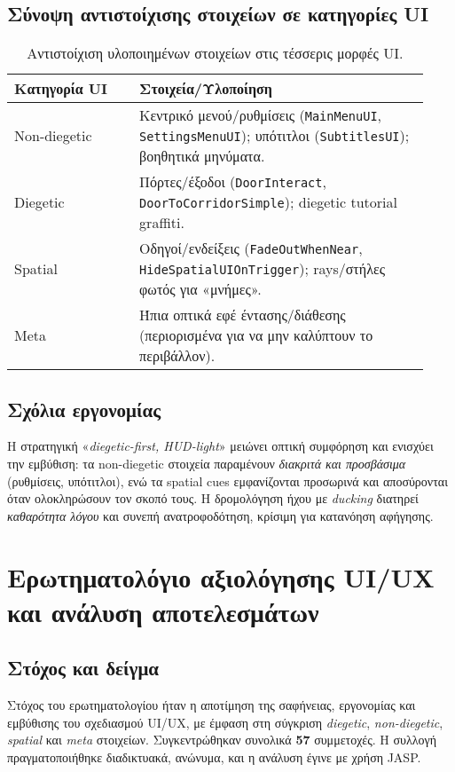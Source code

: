 \subsection{Σύνοψη αντιστοίχισης στοιχείων σε κατηγορίες UI}
\begin{table}[h]
\centering
\begin{tabular}{p{0.28\linewidth} p{0.65\linewidth}}
\toprule
\textbf{Κατηγορία UI} & \textbf{Στοιχεία/Υλοποίηση} \\
\midrule
Non-diegetic & Κεντρικό μενού/ρυθμίσεις (\texttt{MainMenuUI}, \texttt{SettingsMenuUI}); υπότιτλοι (\texttt{SubtitlesUI}); βοηθητικά μηνύματα.  \\
Diegetic & Πόρτες/έξοδοι (\texttt{DoorInteract}, \texttt{DoorToCorridorSimple}); diegetic tutorial graffiti.  \\
Spatial & Οδηγοί/ενδείξεις (\texttt{FadeOutWhenNear}, \texttt{HideSpatialUIOnTrigger}); rays/στήλες φωτός για «μνήμες».  \\
Meta & Ήπια οπτικά εφέ έντασης/διάθεσης (περιορισμένα για να μην καλύπτουν το περιβάλλον). \\
\bottomrule
\end{tabular}
\caption{Αντιστοίχιση υλοποιημένων στοιχείων στις τέσσερις μορφές UI.}
\end{table}


\subsection{Σχόλια εργονομίας}
Η στρατηγική «\textit{diegetic-first, HUD-light}» μειώνει οπτική συμφόρηση και ενισχύει την εμβύθιση: τα non-diegetic στοιχεία παραμένουν \emph{διακριτά και προσβάσιμα} (ρυθμίσεις, υπότιτλοι), ενώ τα spatial cues εμφανίζονται προσωρινά και αποσύρονται όταν ολοκληρώσουν τον σκοπό τους. Η δρομολόγηση ήχου με \textit{ducking} διατηρεί \emph{καθαρότητα λόγου} και συνεπή ανατροφοδότηση, κρίσιμη για κατανόηση αφήγησης.

\section{Ερωτηματολόγιο αξιολόγησης UI/UX και ανάλυση αποτελεσμάτων}
\subsection{Στόχος και δείγμα}
Στόχος του ερωτηματολογίου ήταν η αποτίμηση της σαφήνειας, εργονομίας και εμβύθισης του σχεδιασμού UI/UX, με έμφαση στη σύγκριση \textit{diegetic}, \textit{non-diegetic}, \textit{spatial} και \textit{meta} στοιχείων. Συγκεντρώθηκαν συνολικά \textbf{57} συμμετοχές. Η συλλογή πραγματοποιήθηκε διαδικτυακά, ανώνυμα, και η ανάλυση έγινε με χρήση JASP.

